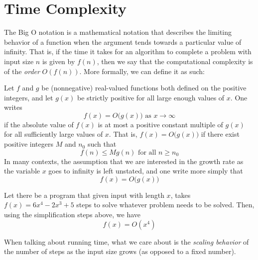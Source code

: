 \section{Time Complexity}

  The Big O notation is a mathematical notation that describes the limiting behavior of a function when the argument tends towards a particular value of infinity. That is, if the time it takes for an algorithm to complete a problem with input size $n$ is given by $f(n)$, then we say that the computational complexity is of the \textit{order} $O(f(n))$. More formally, we can define it as such: 

  \begin{definition}
    \label{def:big-o-notation}
    Let $f$ and $g$ be (nonnegative) real-valued functions both defined on the positive integers, and let $g(x)$ be strictly positive for all large enough values of $x$. One writes
    \begin{equation}
      f(x) = O\big( g(x)\big) \text{ as } x \rightarrow \infty
    \end{equation}
    if the absolute value of $f(x)$ is at most a positive constant multiple of $g(x)$ for all sufficiently large values of $x$. That is, $f(x) = O \big(g(x)\big)$ if there exist positive integers $M$ and $n_0$ such that
    \begin{equation}
      f(n) \leq M g(n) \text{ for all } n \geq n_0
    \end{equation}
    In many contexts, the assumption that we are interested in the growth rate as the variable $x$ goes to infinity is left unstated, and one write more simply that
    \begin{equation}
      f(x) = O\big( g(x)\big)
    \end{equation}
  \end{definition}

  \begin{example}
    \label{ex:simple-runtime-calulation-for-polynomials}
    Let there be a program that given input with length $x$, takes $f(x) = 6x^4 - 2x^3 + 5$ steps to solve whatever problem needs to be solved. Then, using the simplification steps above, we have 
    \begin{equation}
      f(x) = O(x^4)
    \end{equation}
  \end{example}

  When talking about running time, what we care about is the \textit{scaling behavior} of the number of steps as the input size grows (as opposed to a fixed number). 

